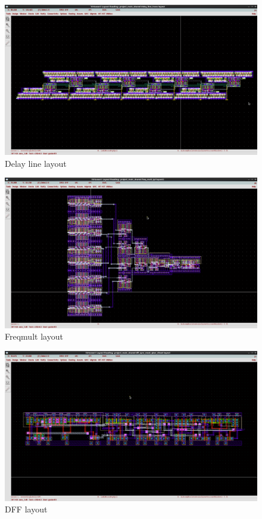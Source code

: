 \documentclass[a4paper,12pt]{article} \usepackage{graphicx}
\begin{document}
\begin{figure}[h]
  \centering
  \includegraphics[width=1.0\textwidth]{../Bilder/Layout/delay_line_trans.png}
  \caption{Delay line layout}
  \label{fig:LD}
\end{figure}

\begin{figure}[h]
  \centering
  \includegraphics[width=1.0\textwidth]{../Bilder/Layout/freq_mult_tpl.png}
  \caption{Freqmult layout}
  \label{fig:LD}
\end{figure}

\begin{figure}[h]
  \centering
  \includegraphics[width=1.0\textwidth]{../Bilder/Layout/dff_sync_reset_qbar_clkset.png}
  \caption{DFF layout}
  \label{fig:LD}
\end{figure}
\end{document}
